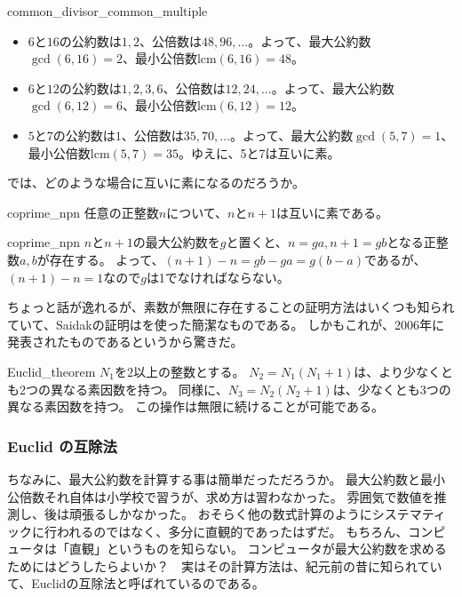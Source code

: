 \begin{Exam}{}{common_divisor_common_multiple}\;
\begin{itemize}
 \item $6$と$16$の公約数は$1,2$、公倍数は$48, 96, \ldots$。よって、最大公約数$\gcd(6,16)=2$、最小公倍数$\mbox{lcm}(6,16)=48$。
 \item $6$と$12$の公約数は$1,2,3,6$、公倍数は$12, 24, \ldots$。よって、最大公約数$\gcd(6,12)=6$、最小公倍数$\mbox{lcm}(6,12)=12$。
 \item $5$と$7$の公約数は$1$、公倍数は$35, 70, \ldots$。よって、最大公約数$\gcd(5,7)=1$、最小公倍数$\mbox{lcm}(5,7)=35$。ゆえに、5と7は互いに素。
\end{itemize}
\end{Exam}

では、どのような場合に互いに素になるのだろうか。

\begin{Prop}{}{coprime_npn}
任意の正整数$n$について、$n$と$n+1$は互いに素である。
\end{Prop}

\begin{prProof}{coprime_npn}
$n$と$n+1$の最大公約数を$g$と置くと、$n=ga, n+1=gb$となる正整数$a,b$が存在する。
よって、$(n+1)-n=gb-ga=g(b-a)$であるが、$(n+1)-n=1$なので$g$は1でなければならない。
\end{prProof}

ちょっと話が逸れるが、素数が無限に存在することの証明方法はいくつも知られていて、Saidakの証明はを使った簡潔なものである\cite{Saidak2006}。
しかもこれが、2006年に発表されたものであるというから驚きだ。

\begin{thProof}{Euclid_theorem}
$N_1$を$2$以上の整数とする。
$N_2=N_1(N_1+1)$は、より少なくとも2つの異なる素因数を持つ。
同様に、$N_3=N_2(N_2+1)$は、少なくとも3つの異なる素因数を持つ。
この操作は無限に続けることが可能である。
\end{thProof}

\subsubsection{Euclid の互除法}
ちなみに、最大公約数を計算する事は簡単だっただろうか。
最大公約数と最小公倍数それ自体は小学校で習うが、求め方は習わなかった。
雰囲気で数値を推測し、後は頑張るしかなかった。
おそらく他の数式計算のようにシステマティックに行われるのではなく、多分に直観的であったはずだ。
もちろん、コンピュータは「直観」というものを知らない。
コンピュータが最大公約数を求めるためにはどうしたらよいか？　実はその計算方法は、紀元前の昔に知られていて、Euclidの互除法と呼ばれているのである。

